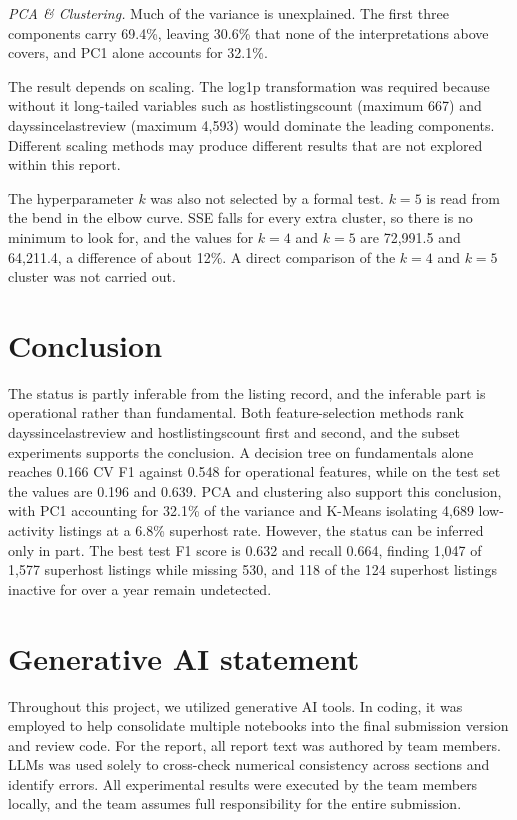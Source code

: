 \documentclass[final,1p,11pt]{elsarticle}
\renewcommand\_{\textunderscore\allowbreak}%
\begin{document}
\textit{PCA \& Clustering.} Much of the variance is unexplained. The first three components carry 69.4\%, leaving 30.6\% that none of the interpretations above covers, and PC1 alone accounts for 32.1\%.

The result depends on scaling. The log1p transformation was required because without it long-tailed variables such as host\_listings\_count (maximum 667) and days\_since\_last\_review (maximum 4,593) would dominate the leading components. Different scaling methods may produce different results that are not explored within this report.

The hyperparameter $k$ was also not selected by a formal test. $k=5$ is read from the bend in the elbow curve. SSE falls for every extra cluster, so there is no minimum to look for, and the values for $k=4$ and $k=5$ are 72,991.5 and 64,211.4, a difference of about 12\%. A direct comparison of the $k=4$ and $k=5$ cluster was not carried out.

\FloatBarrier

\section{Conclusion}

The status is partly inferable from the listing record, and the inferable part is operational rather than fundamental. Both feature-selection methods rank days\_since\_last\_review and host\_listings\_count first and second, and the subset experiments supports the conclusion. A decision tree on fundamentals alone reaches 0.166 CV F1 against 0.548 for operational features, while on the test set the values are 0.196 and 0.639. PCA and clustering also support this conclusion, with PC1 accounting for 32.1\% of the variance and K-Means isolating 4,689 low-activity listings at a 6.8\% superhost rate. However, the status can be inferred only in part. The best test F1 score is 0.632 and recall 0.664, finding 1,047 of 1,577 superhost listings while missing 530, and 118 of the 124 superhost listings inactive for over a year remain undetected.

\section*{Generative AI statement}
Throughout this project, we utilized generative AI tools. In coding, it was employed to help consolidate multiple notebooks into the final submission version and review code. For the report, all report text was authored by team members. LLMs was used solely to cross-check numerical consistency across sections and identify errors. All experimental results were executed by the team members locally, and the team assumes full responsibility for the entire submission.
\end{document}

